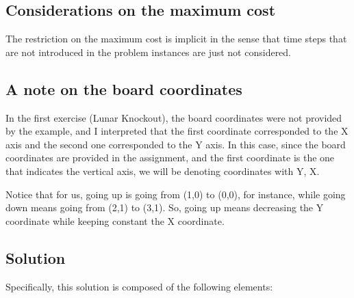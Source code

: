 \documentclass{article}
\begin{document}
\begin{enumerate}
\subsection*{Considerations on the maximum cost}

The restriction on the maximum cost is implicit in the sense that time steps that are not introduced in the problem instances are just not considered.

\subsection*{A note on the board coordinates}
In the first exercise (Lunar Knockout), the board coordinates were not provided by the example, and I interpreted that the first coordinate corresponded to the X axis and the second one corresponded to the Y axis. In this case, since the board coordinates are provided in the assignment, and the first coordinate is the one that indicates the vertical axis, we will be denoting coordinates with Y, X.

Notice that for us, going up is going from (1,0) to (0,0), for instance, while going down means going from (2,1) to (3,1). So, going up means decreasing the Y coordinate while keeping constant the X coordinate.

\subsection*{Solution}
Specifically, this solution is composed of the following elements:



\end{enumerate}
\end{document}
